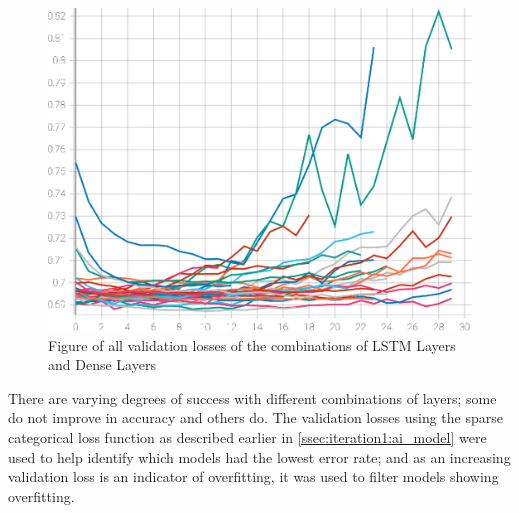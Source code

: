 \begin{figure}[ht]
    \centering
    \includegraphics[width=0.95\columnwidth]{figures/results/cnn_iteration2_all_loss.eps}
    \caption[Figure of accuracies and losses for Iteration 3]{Figure of all validation losses of the combinations of LSTM Layers and Dense Layers}
    \label{fig:iteration3_all_loss}
\end{figure}
\FloatBarrier

There are varying degrees of success with different combinations of layers; some do not improve in accuracy and others do.
The validation losses using the sparse categorical loss function as described earlier in \autoref{ssec:iteration1:ai_model}
were used to help identify which models had the lowest error rate; and as an increasing validation
loss is an indicator of overfitting, it was used to filter models showing overfitting.


